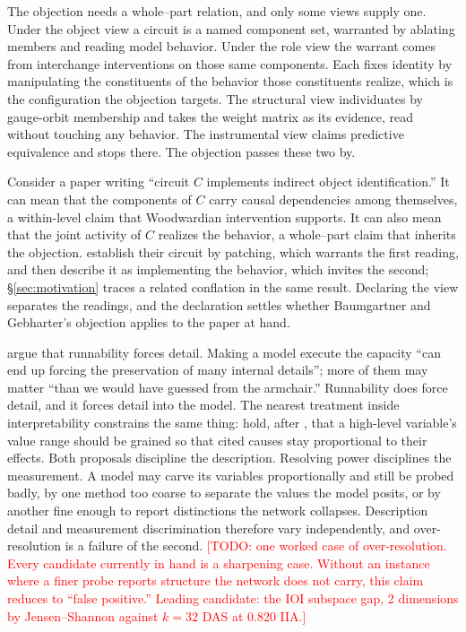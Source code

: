 The objection needs a whole--part relation, and only some views supply one.
Under the object view a circuit is a named component set, warranted by ablating
members and reading model behavior.  Under the role view the warrant comes from
interchange interventions on those same components.  Each fixes identity by
manipulating the constituents of the behavior those constituents realize, which
is the configuration the objection targets.  The structural view individuates by
gauge-orbit membership and takes the weight matrix as its evidence, read without
touching any behavior.  The instrumental view claims predictive equivalence and
stops there.  The objection passes these two by.

Consider a paper writing ``circuit $C$ implements indirect object
identification.''  It can mean that the components of $C$ carry causal
dependencies among themselves, a within-level claim that Woodwardian
intervention supports.  It can also mean that the joint activity of $C$ realizes
the behavior, a whole--part claim that inherits the objection.
\citet{wang2022} establish their circuit by patching, which warrants the first
reading, and then describe it as implementing the behavior, which invites the
second; \S\ref{sec:motivation} traces a related conflation in the same result.
Declaring the view separates the readings, and the declaration settles whether
Baumgartner and Gebharter's objection applies to the paper at hand.


\citet{caoyamins2024a} argue that runnability forces detail.  Making a model
execute the capacity ``can end up forcing the preservation of many internal
details''; more of them may matter ``than we would have guessed from the
armchair.''  Runnability does force detail, and it forces detail into the
model.  The nearest treatment inside interpretability constrains the same
thing: \citet{geiger2023} hold, after \citet{yablo1992}, that a high-level
variable's value range should be grained so that cited causes stay proportional
to their effects.  Both proposals discipline the description.  Resolving power
disciplines the measurement.  A model may carve its variables proportionally and
still be probed badly, by one method too coarse to separate the values the model
posits, or by another fine enough to report distinctions the network collapses.
Description detail and measurement discrimination therefore vary independently,
and over-resolution is a failure of the second.
\textcolor{red}{[TODO: one worked case of over-resolution. Every candidate
currently in hand is a sharpening case. Without an instance where a finer probe
reports structure the network does not carry, this claim reduces to
``false positive.'' Leading candidate: the IOI subspace gap, 2 dimensions by
Jensen--Shannon against $k=32$ DAS at 0.820 IIA.]}

